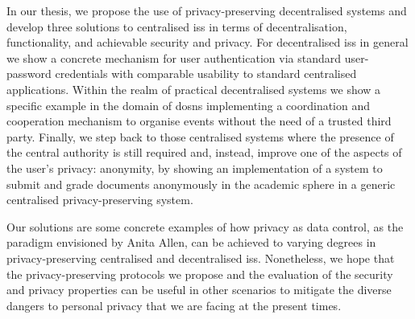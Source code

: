     In our thesis, we propose the use of privacy-preserving decentralised systems 
    and develop three solutions to centralised \aclp*{is} in terms of decentralisation, 
    functionality, and achievable security and privacy. For decentralised \aclp*{is} 
    in general we show a concrete mechanism for user authentication via standard 
    user-password credentials with comparable usability to standard centralised 
    applications. Within the realm of practical decentralised systems we show a 
    specific example in the domain of \aclp*{dosn} implementing a coordination and 
    cooperation mechanism to organise events without the need of a trusted third 
    party. Finally, we step back to those centralised systems where the presence 
    of the central authority is still required and, instead, improve one of the 
    aspects of the user's privacy: anonymity, by showing an implementation of a 
    system to submit and grade documents anonymously in the academic sphere in a 
    generic centralised privacy-preserving system.

    Our solutions are some concrete examples of how privacy as data control, as 
    the paradigm envisioned by Anita Allen, can be achieved to varying degrees in 
    privacy-preserving centralised and decentralised \aclp*{is}. Nonetheless, we 
    hope that the privacy-preserving protocols we propose and the evaluation of 
    the security and privacy properties can be useful in other scenarios to mitigate 
    the diverse dangers to personal privacy that we are facing at the present times.
